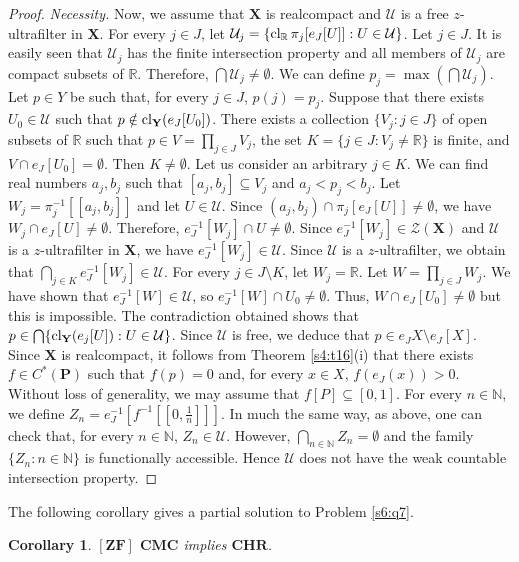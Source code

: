 \documentclass[12pt,twoside,leqno]{article}
\theoremstyle{plain}
\newtheorem{corollary}[theorem]{Corollary}
\theoremstyle{definition}
\theoremstyle{remark}
\DeclareMathOperator{\cl}{{\rm cl}}
\begin{document}
\begin{proof}
	\textit{Necessity.} Now, we assume that $\mathbf{X}$ is realcompact and $\mathcal{U}$ is a free $z$-ultrafilter in $\mathbf{X}$. For every $j\in J$, let $\mathcal{U}_j=\{ \cl_{\mathbb{R}}\pi_j[e_J[U]]: U\in\mathcal{U}\}$. Let $j\in J$.  It is easily seen that $\mathcal{U}_j$ has the finite intersection property and all members of $\mathcal{U}_j$ are compact subsets of $\mathbb{R}$. Therefore, $\bigcap\mathcal{U}_j\neq\emptyset$. We can define $p_j=\max(\bigcap\mathcal{U}_j)$. Let $p\in Y$ be such that, for every $j\in J$, $p(j)=p_j$. Suppose that there exists $U_0\in\mathcal{U}$ such that $p\notin\cl_{\mathbf{Y}}(e_J[U_0])$. There exists a collection $\{V_j: j\in J\}$ of open subsets of $\mathbb{R}$ such that $p\in V=\prod\limits_{j\in J}V_j$, the set $K=\{j\in J: V_j\neq\mathbb{R}\}$ is finite, and $V\cap e_J[U_0]=\emptyset$. Then $K\neq\emptyset$. Let us consider an arbitrary $j\in K$. We can find real numbers $a_j, b_j$ such that $[a_j, b_j]\subseteq V_j$ and $a_j<p_j<b_j$. Let $W_j=\pi_j^{-1}[[a_j, b_j]]$ and let $U\in\mathcal{U}$. Since $(a_j, b_j)\cap \pi_j[e_J[U]]\neq\emptyset$, we have $W_j\cap e_J[U]\neq\emptyset$. Therefore, $e_J^{-1}[W_j]\cap U\neq\emptyset$. Since $e_J^{-1}[W_j]\in\mathcal{Z}(\mathbf{X})$ and $\mathcal{U}$ is a $z$-ultrafilter in $\mathbf{X}$, we have $e_J^{-1}[W_j]\in\mathcal{U}$. Since $\mathcal{U}$ is a $z$-ultrafilter, we obtain that $\bigcap\limits_{j\in K}e_J^{-1}[W_j]\in\mathcal{U}$. For every $j\in J\setminus K$, let $W_j=\mathbb{R}$. Let $W=\prod\limits_{j\in J}W_j$. We have shown that $e_J^{-1}[W]\in\mathcal{U}$, so $e_J^{-1}[W]\cap U_0\neq\emptyset$. Thus, $W\cap e_J[U_0]\neq\emptyset$ but this is impossible. The contradiction obtained shows that $p\in\bigcap\{\cl_{\mathbf{Y}}(e_j[U]): U\in\mathcal{U}\}$. Since $\mathcal{U}$ is free, we deduce that $p\in e_J X\setminus e_J[X]$. Since $\mathbf{X}$ is realcompact, it follows from Theorem \ref{s4:t16}(i) that there exists $f\in C^{\ast}(\mathbf{P})$ such that $f(p)=0$ and, for every $x\in X$, $f(e_J(x))>0$. Without loss of generality, we may assume that $f[P]\subseteq[0, 1]$. For every $n\in\mathbb{N}$, we define $Z_n=e_J^{-1}[f^{-1}[[0, \frac{1}{n}]]]$. In much the same way, as above, one can check that, for every $n\in\mathbb{N}$, $Z_n\in\mathcal{U}$. However, $\bigcap\limits_{n\in\mathbb{N}}Z_n=\emptyset$ and the family $\{Z_n: n\in\mathbb{N}\}$ is functionally accessible. Hence $\mathcal{U}$ does not have the weak countable intersection property. 
\end{proof}

The following corollary gives a partial solution to Problem \ref{s6:q7}.
\begin{corollary}
	\label{s6:c11}
	$[\mathbf{ZF}]$
	$\mathbf{CMC}$ implies $\mathbf{CHR}$.
\end{corollary}
\end{document}
